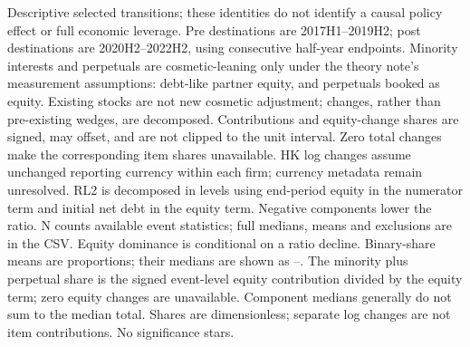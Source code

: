 \begin{table}[!htbp]
\begin{threeparttable}
\begin{tablenotes}[flushleft]
\item[] Descriptive selected transitions; these identities do not identify a causal policy effect or full economic leverage. Pre destinations are 2017H1--2019H2; post destinations are 2020H2--2022H2, using consecutive half-year endpoints. Minority interests and perpetuals are cosmetic-leaning only under the theory note's measurement assumptions: debt-like partner equity, and perpetuals booked as equity. Existing stocks are not new cosmetic adjustment; changes, rather than pre-existing wedges, are decomposed. Contributions and equity-change shares are signed, may offset, and are not clipped to the unit interval. Zero total changes make the corresponding item shares unavailable. HK log changes assume unchanged reporting currency within each firm; currency metadata remain unresolved. RL2 is decomposed in levels using end-period equity in the numerator term and initial net debt in the equity term. Negative components lower the ratio. N counts available event statistics; full medians, means and exclusions are in the CSV. Equity dominance is conditional on a ratio decline. Binary-share means are proportions; their medians are shown as --. The minority plus perpetual share is the signed event-level equity contribution divided by the equity term; zero equity changes are unavailable.  Component medians generally do not sum to the median total. Shares are dimensionless; separate log changes are not item contributions. No significance stars.
\end{tablenotes}
\end{threeparttable}
\end{table}

